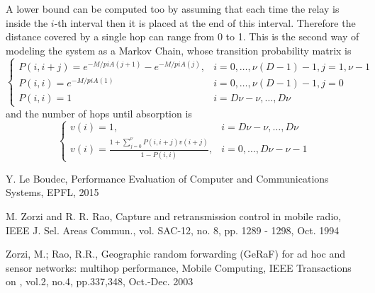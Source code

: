 \documentclass[10pt]{article}
\begin{document}
A lower bound can be computed too by assuming that each time the relay is inside the $i$-th interval then it is placed at the end of this interval. Therefore the distance covered by a single hop can range from 0 to 1. This is the second way of modeling the system as a Markov Chain, whose transition probability matrix is
\begin{equation}
\begin{cases}
  P(i, i + j) = e^{-M/pi A(j+1)} - e^{-M/pi A(j)}, & i = 0, \dots, \nu (D - 1) - 1, j = 1, \nu-1 \\
  P(i, i) = e^{-M/pi A(1)} & i = 0, \dots, \nu (D - 1) - 1, j = 0 \\
  P(i, i) = 1 & i = D\nu - \nu, \dots, D\nu 
\end{cases}
\end{equation}
and the number of hops until absorption is
\begin{equation}
\begin{cases}
  v(i) = 1, & i = D\nu - \nu , \dots, D\nu  \\
  v(i) = \frac{1+\sum_{j = 0}^{\nu} P(i, i + j) v(i + j)}{1-P(i, i)}, & i = 0, \dots, D\nu - \nu - 1
\end{cases}
\end{equation}


\begin{thebibliography}{10}

Y. Le Boudec, Performance Evaluation of Computer and Communications Systems, EPFL, 2015

M. Zorzi and R. R. Rao, Capture and retransmission control in
mobile radio, IEEE J. Sel. Areas Commun., vol. SAC-12, no. 8, pp.
1289 - 1298, Oct. 1994

Zorzi, M.; Rao, R.R., Geographic random forwarding (GeRaF) for ad hoc and sensor networks: multihop performance, Mobile Computing, IEEE Transactions on , vol.2, no.4, pp.337,348, Oct.-Dec. 2003


\end{thebibliography}
\end{document}
